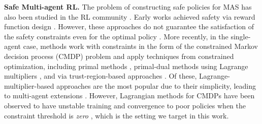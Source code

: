 \noindent\textbf{Safe Multi-agent RL. }
The problem of constructing safe policies for MAS has also been studied in the RL community \citep{garg2024learning}.
Early works achieved safety via reward function design \citep{chen2017decentralized,chen2017socially,long2018towards,everett2018motion,semnani2020multi}.
However, these approaches do not guarantee the satisfaction of the safety constraints even for the optimal policy \citep{massiani2022safe,everett2018motion,long2018towards}.
More recently, in the single-agent case, methods work with constraints in the form of the constrained Markov decision process (CMDP) problem and apply techniques from constrained optimization, including 
primal methods \citep{xu2021crpo},
primal-dual methods using Lagrange multipliers \citep{borkar2005actor,tessler2018reward,he2023autocost,huang2024safedreamer},
and via trust-region-based approaches \citep{achiam2017constrained,he2023autocost}.
Of these, Lagrange-multiplier-based approaches are the most popular due to their simplicity,
leading to multi-agent extensions \citep{gu2023safe,liu2021cmix,ding2023provably,lu2021decentralized,geng2023reinforcement,zhao2024multi}.
However, Lagrangian methods for CMDPs have been observed to have unstable training and convergence to poor policies when the constraint threshold is \textit{zero} 
\citep{zanon2020safe,he2023autocost,so2023solving,ganai2024iterative}, which is the setting we target in this work.